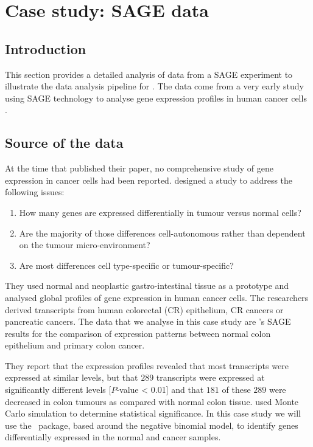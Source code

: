 
\section{Case study: SAGE data} \label{zhang}
\subsection{Introduction}
This section provides a detailed analysis of data from a SAGE
experiment to illustrate the data analysis pipeline for \edgeR. The
data come from a very early study using SAGE technology to analyse
gene expression profiles in human cancer cells \citep{Zhang:1997p13}.

\subsection{Source of the data}
At the time that \citet{Zhang:1997p13} published their paper, no
comprehensive study of gene expression in cancer cells had been
reported. \citet{Zhang:1997p13} designed a study to address the
following issues:
\begin{enumerate}
\item How many genes are expressed differentially in tumour versus
  normal cells?
\item Are the majority of those differences cell-autonomous rather
  than dependent on the tumour micro-environment?
\item Are most differences cell type-specific or tumour-specific?
\end{enumerate}
They used normal and neoplastic gastro-intestinal tissue as a
prototype and analysed global profiles of gene expression in human
cancer cells. The researchers derived transcripts from human
colorectal (CR) epithelium, CR cancers or pancreatic cancers. The data
that we analyse in this case study are \citet{Zhang:1997p13}'s SAGE
results for the comparison of expression patterns between normal colon
epithelium and primary colon cancer.

They report that the expression profiles revealed that most
transcripts were expressed at similar levels, but that $289$
transcripts were expressed at significantly different levels
[$P$-value < 0.01] and that $181$ of these $289$ were decreased in
colon tumours as compared with normal colon
tissue. \citet{Zhang:1997p13} used Monte Carlo simulation to determine
statistical significance. In this case study we will use the
\edgeR~package, based around the negative binomial model, to identify
genes differentially expressed in the normal and cancer samples.


